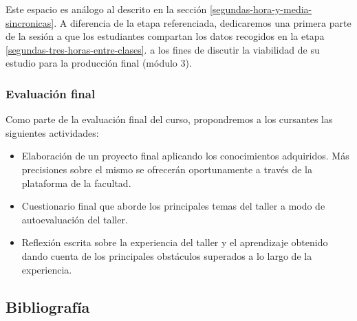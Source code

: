 Este espacio es análogo al descrito en la sección \ref{segundas-hora-y-media-sincronicas}. A diferencia de la etapa referenciada, dedicaremos una primera parte de la sesión a que los estudiantes compartan los datos recogidos en la etapa \ref{segundas-tres-horas-entre-clases}. a los fines de discutir la viabilidad de su estudio para la producción final (módulo 3).

\subsubsection{Evaluación final}

Como parte de la evaluación final del curso, propondremos a los cursantes las siguientes actividades:
\begin{itemize}
	\item Elaboración de un proyecto final aplicando los conocimientos adquiridos. Más precisiones sobre el mismo se ofrecerán oportunamente a través de la plataforma de la facultad.
	\item Cuestionario final que aborde los principales temas del taller a modo de autoevaluación del taller.
	\item Reflexión escrita sobre la experiencia del taller y el aprendizaje obtenido dando cuenta de los principales obstáculos superados a lo largo de la experiencia.
\end{itemize}

\subsection{Bibliografía}

\nocite{*}
\printbibliography[keyword={02}]